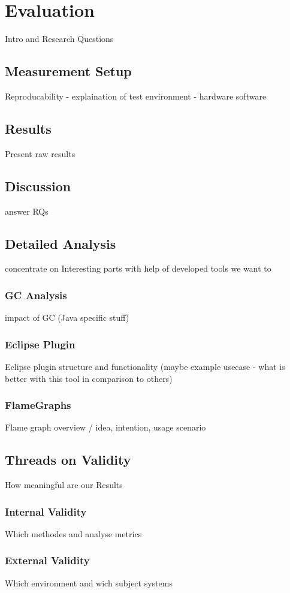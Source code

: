 \chapter{Evaluation}
\label{chap:analysis}

Intro and Research Questions

\section{Measurement Setup}

Reproducability - explaination of test environment - hardware software

\section{Results}

Present raw results


\section{Discussion}
\label{discussion}

answer RQs

\section{Detailed Analysis}

concentrate on Interesting parts
with help of developed tools we want to

\subsection{GC Analysis}
\label{gc_analysis}

impact of GC (Java specific stuff)

\subsection{Eclipse Plugin}
\label{eclipse_plugin}

Eclipse plugin structure and functionality (maybe example usecase - what is better with this tool in comparison to others)

\subsection{FlameGraphs}
\label{flame_graph}

Flame graph overview / idea, intention, usage scenario

\section{Threads on Validity}

How meaningful are our Results

\subsection{Internal Validity}

Which methodes and analyse metrics

\subsection{External Validity}

Which environment and wich subject systems